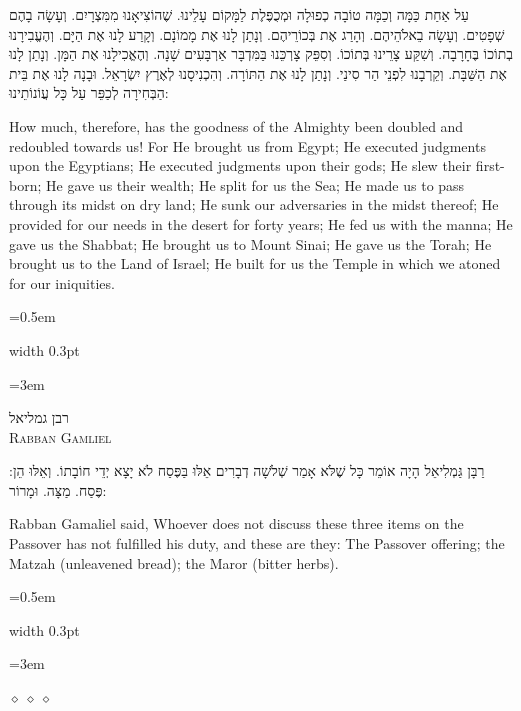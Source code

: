 \documentclass[11pt, openany]{book}
\newcommand{\sederdivider}{%
  \par\vspace{6pt}
  \begin{center}
    \textcolor{sedergold}{\pgfornament[width=1.5cm]{11}}
  \end{center}
  \par\vspace{6pt}
}
\newlength{\bidiHebWidth}
\newlength{\bidiEngWidth}
\newenvironment{bilingual}{%
  \par\vspace{4pt}%
}{%
  \noindent
  \begin{minipage}[t]{\bidiEngWidth}
    \setstretch{1.4}\emergencystretch=0.5em\normalsize
    \usebox{\bidiEngBox}
  \end{minipage}%
  \hfill
  {\color{sedergold}\vrule width 0.3pt}%
  \hfill
  \begin{minipage}[t]{\bidiHebWidth}
    \begingroup\hebrewfont\TeXXeTstate=1\beginR
    \large\setstretch{1.4}\emergencystretch=3em\tolerance=9999\parindent=0pt\relax
    \usebox{\bidiHebBox}
    \endR\endgroup
  \end{minipage}%
  \par\vspace{2pt}%
}
\newenvironment{hebrewcol}{%
  \begin{lrbox}{\bidiHebBox}\begin{minipage}{\bidiHebWidth}%
}{%
  \end{minipage}\end{lrbox}%
}
\newenvironment{englishcol}{%
  \begin{lrbox}{\bidiEngBox}\begin{minipage}{\bidiEngWidth}%
}{%
  \end{minipage}\end{lrbox}%
}
\newcommand{\parasep}{%
  \par\vspace{3pt}
  \begin{center}
    \textcolor{sedergold!50}{\tiny$\diamond\;\diamond\;\diamond$}
  \end{center}
  \par\vspace{3pt}
}
\newcommand{\subsedertitle}[2]{%
  \par\vspace{8pt}
  \begin{center}
    {\hebrewfontlarge\TeXXeTstate=1\beginR\textcolor{sederblue}{#1}\endR}\\[3pt]
    {\normalsize\scshape\textcolor{sederblue}{#2}}
  \end{center}
  \par\vspace{3pt}
}
\begin{document}
\begin{bilingual}
\begin{hebrewcol}
עַל אַחַת כַּמָּה וְכַמָּה טוֹבָה כְפוּלָה וּמְכֻפֶּלֶת לַמָּקוֹם עָלֵינוּ. שֶׁהוֹצִיאָנוּ מִמִּצְרָיִם. וְעָשָׂה בָהֶם שְׁפָטִים. וְעָשָׂה בֵאלֹהֵיהֶם. וְהָרַג אֶת בְּכוֹרֵיהֶם. וְנָתַן לָנוּ אֶת מָמוֹנָם. וְקָרַע לָנוּ אֶת הַיָּם. וְהֶעֱבִירָנוּ בְתוֹכוֹ בֶּחָרָבָה. וְשִׁקַּע צָרֵינוּ בְּתוֹכוֹ. וְסִפֵּק צָרְכֵּנוּ בַּמִּדְבָּר אַרְבָּעִים שָׁנָה. וְהֶאֱכִילָנוּ אֶת הַמָּן. וְנָתַן לָנוּ אֶת הַשַּׁבָּת. וְקֵרְבָנוּ לִפְנֵי הַר סִינַי. וְנָתַן לָנוּ אֶת הַתּוֹרָה. וְהִכְנִיסָנוּ לְאֶרֶץ יִשְׂרָאֵל. וּבָנָה לָנוּ אֶת בֵּית הַבְּחִירָה לְכַפֵּר עַל כָּל עֲוֹנוֹתֵינוּ:
\end{hebrewcol}
\begin{englishcol}
How much, therefore, has the goodness of the Almighty been doubled and redoubled towards us! For He brought us from Egypt; He executed judgments upon the Egyptians; He executed judgments upon their gods; He slew their first-born; He gave us their wealth; He split for us the Sea; He made us to pass through its midst on dry land; He sunk our adversaries in the midst thereof; He provided for our needs in the desert for forty years; He fed us with the manna; He gave us the Shabbat; He brought us to Mount Sinai; He gave us the Torah; He brought us to the Land of Israel; He built for us the Temple in which we atoned for our iniquities.
\end{englishcol}
\end{bilingual}
\sederdivider

\subsedertitle{רבן גמליאל}{Rabban Gamliel}

\begin{bilingual}
\begin{hebrewcol}
רַבָּן גַּמְלִיאֵל הָיָה אוֹמֵר כָּל שֶׁלֹּא אָמַר שְׁלֹשָׁה דְבָרִים אֵלּוּ בַּפֶּסַח לֹא יָצָא יְדֵי חוֹבָתוֹ. וְאֵלּוּ הֵן: פֶּסַח. מַצָּה. וּמָרוֹר:
\end{hebrewcol}
\begin{englishcol}
Rabban Gamaliel said, Whoever does not discuss these three items on the Passover has not fulfilled his duty, and these are they: The Passover offering; the Matzah (unleavened bread); the Maror (bitter herbs).
\end{englishcol}
\end{bilingual}
\parasep
\end{document}
